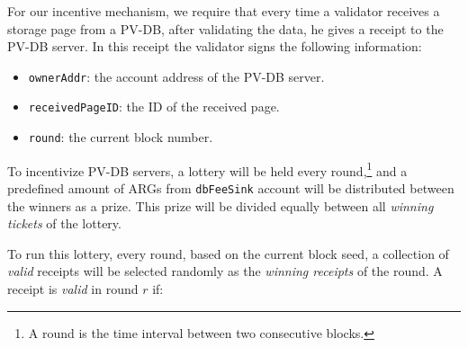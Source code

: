 For our incentive mechanism, we require that every time a validator receives a storage page from a PV-DB, after
validating the data, he gives a receipt to the PV-DB server. In this receipt the validator signs the
following information:

\begin{itemize}
    \item \texttt{ownerAddr}: the account address of the PV-DB server.
    \item \texttt{receivedPageID}: the ID of the received page.
    \item \texttt{round}: the current block number.
\end{itemize}


To incentivize PV-DB servers, a lottery will be held every round,\footnote{A round is the time interval between
two consecutive blocks.} and a predefined amount of ARGs from
\texttt{dbFeeSink} account will be distributed between the winners as a prize. This prize will be divided equally
between all \emph{winning tickets} of the lottery.


To run this lottery, every round, based on the current block seed, a collection of \emph{valid} receipts will be
selected randomly as the \emph{winning receipts} of the round. A receipt is \emph{valid} in round $r$ if:

